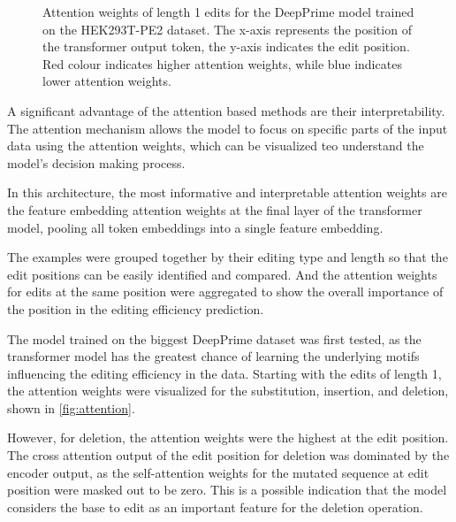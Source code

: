 \begin{figure}
    \centering
    \caption[Attention weights for the DeepPrime model trained on the HEK293T-PE2 dataset]{Attention weights of length 1 edits for the DeepPrime model trained on the HEK293T-PE2 dataset. The x-axis represents the position of the transformer output token, the y-axis indicates the edit position. Red colour indicates higher attention weights, while blue indicates lower attention weights.}
    \label{fig:attention}
\end{figure}

A significant advantage of the attention based methods are their interpretability. The attention mechanism allows the model to focus on specific parts of the input data using the attention weights, which can be visualized teo understand the model's decision making process. 

In this architecture, the most informative and interpretable attention weights are the feature embedding attention weights at the final layer of the transformer model, pooling all token embeddings into a single feature embedding. 

The examples were grouped together by their editing type and length so that the edit positions can be easily identified and compared. And the attention weights for edits at the same position were aggregated to show the overall importance of the position in the editing efficiency prediction.

The model trained on the biggest DeepPrime dataset was first tested, as the transformer model has the greatest chance of learning the underlying motifs influencing the editing efficiency in the data. Starting with the edits of length 1, the attention weights were visualized for the substitution, insertion, and deletion, shown in \autoref{fig:attention}. 

However, for deletion, the attention weights were the highest at the edit position. The cross attention output of the edit position for deletion was dominated by the encoder output, as the self-attention weights for the mutated sequence at edit position were masked out to be zero. This is a possible indication that the model considers the base to edit as an important feature for the deletion operation.